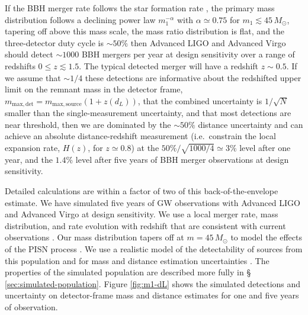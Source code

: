 \documentclass[modern]{aastex62}
\newcommand{\MPISN}{45 \, \MSun{}}
\newcommand{\zpivot}{0.8}
\newcommand{\MSun}{M_\odot}
\begin{document}
If the \ac{BBH} merger rate follows the star formation rate
\citep{Fishbach2018,O1O2Population}, the primary mass distribution follows a
declining power law $m_1^{-\alpha}$ with $\alpha \simeq 0.75$ for $m_1 \lesssim
\MPISN{}$, tapering off above this mass scale, the mass ratio distribution is
flat, and the three-detector duty cycle is $\sim 50\%$ then Advanced LIGO and
Advanced Virgo should detect $\sim 1000$ \ac{BBH} mergers per year at design
sensitivity over a range of redshifts $0 \leq z \lesssim 1.5$.  The typical
detected merger will have a redshift $z \sim 0.5$.  If we assume that $\sim
1/4$ these detections are informative about the redshifted upper limit on the
remnant mass in the detector frame, $m_\mathrm{max,det} = m_\mathrm{max,source}
\left(1 + z\left( d_L \right) \right)$, that the combined uncertainty is
$1/\sqrt{N}$ smaller than the single-measurement uncertainty, and that most
detections are near threshold, then we are dominated by the $\sim 50\%$ distance
uncertainty and can achieve an absolute distance-redshift measurement (i.e.\
constrain the local expansion rate, $H(z)$, for $z \simeq \zpivot{}$) at the $50 \% /
\sqrt{1000/4} \simeq 3 \%$ level after one year, and the $1.4 \%$ level after
five years of \ac{BBH} merger observations at design sensitivity.

Detailed calculations are within a factor of two of this back-of-the-envelope
estimate.  We have simulated five years of \ac{GW} observations with Advanced
LIGO and Advanced Virgo at design sensitivity.  We use a local merger rate, mass
distribution, and rate evolution with redshift that are consistent with current
observations \citep{Fishbach2017,Fishbach2018,O1O2Population}.  Our mass
distribution tapers off at $m = \MPISN{}$ to model the effects of the \ac{PISN}
process \citep{Belczynski2016}.  We use a realistic model of the detectability
of sources from this population \citep{GW150914Rate,GW150914RateSupplement} and
for mass and distance estimation uncertainties \citep{Vitale2017}.  The
properties of the simulated population are described more fully in \S
\ref{sec:simulated-population}.  Figure \ref{fig:m1-dL} shows the simulated
detections and uncertainty on detector-frame mass and distance estimates for one
and five years of observation.
\end{document}
